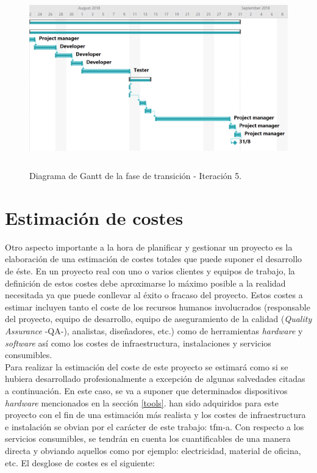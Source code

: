 \documentclass[12pt,a4paper, twoside]{report}
\begin{document}
\begin{itemize}
		\begin{figure}[!ht]   
			\caption{Diagrama de Gantt de la fase de transición - Iteración 5.} 
			\begin{center} 
		 		\includegraphics[width=17 cm,height=7cm]{Images/planning/iterations/It5_gantt} \\
				\label{fig:planning-it5-gantt} 
			\end{center}  
		\end{figure}  
		
	\end{itemize}
	
	\newpage
	
	\section{Estimación de costes}
		
	Otro aspecto importante a la hora de planificar y gestionar un proyecto es la elaboración de una estimación de costes totales que puede suponer el desarrollo de éste. En un proyecto real con uno o varios clientes y equipos de trabajo, la definición de estos costes debe aproximarse lo máximo posible a la realidad necesitada ya que puede conllevar al éxito o fracaso del proyecto. Estos costes a estimar incluyen tanto el coste de los recursos humanos involucrados (responsable del proyecto, equipo de desarrollo, equipo de aseguramiento de la calidad (\textit{Quality Assurance} -QA-), analistas, diseñadores, etc.) como de herramientas \textit{hardware} y \textit{software} así como los costes de infraestructura, instalaciones y servicios consumibles. \\
	
	Para realizar la estimación del coste de este proyecto se estimará como si se hubiera desarrollado profesionalmente a excepción de algunas salvedades citadas a continuación. En este caso, se va a suponer que determinados dispositivos \textit{hardware} mencionados en la sección \ref{tools}.  han sido adquiridos para este proyecto con el fin de una estimación más realista y los costes de infraestructura e instalación se obvian por el carácter de este trabajo: \gls{tfm-a}. Con respecto a los servicios consumibles, se tendrán en cuenta los cuantificables de una manera directa y obviando aquellos como por ejemplo: electricidad, material de oficina, etc. El desglose de costes es el siguiente: \\
	
\end{document}
